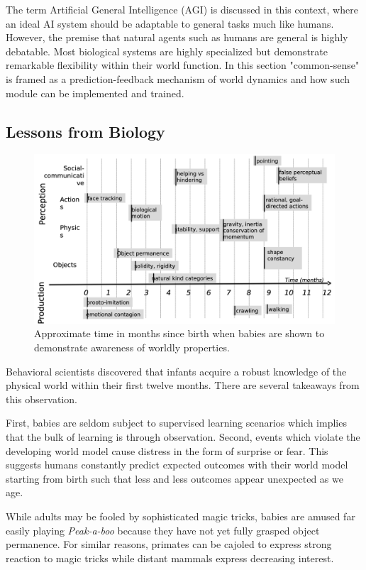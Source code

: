 The term Artificial General Intelligence (AGI) is discussed in this context, where an ideal AI system should be adaptable to general tasks much like humans. However, the premise that natural agents such as humans are general is highly debatable. Most biological systems are highly specialized but demonstrate remarkable flexibility within their world function. In this section "common-sense" is framed as a prediction-feedback mechanism of world dynamics and how such module can be implemented and trained.

\subsection{Lessons from Biology}

\begin{figure}
\includegraphics[width=\linewidth]{lectures/12-b/baby.png}
\centering
\caption{Approximate time in months since birth when babies are shown to demonstrate awareness of worldly properties.}
\label{fig:baby}
\end{figure}

Behavioral scientists discovered that infants acquire a robust knowledge of the physical world within their first twelve months. 
There are several takeaways from this observation. 

First, babies are seldom subject to supervised learning scenarios which implies that the bulk of learning is through observation. 
Second, events which violate the developing world model cause distress in the form of surprise or fear. 
This suggests humans constantly predict expected outcomes with their world model starting from birth such that less and less outcomes appear unexpected as we age. 

While adults may be fooled by sophisticated magic tricks, babies are amused far easily playing \textit{Peak-a-boo} because they have not yet fully grasped object permanence. For similar reasons, primates can be cajoled to express strong reaction to magic tricks while distant mammals express decreasing interest.

